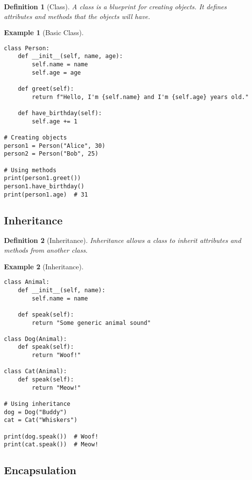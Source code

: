 \documentclass[11pt]{article}
\newtheorem{definition}{Definition}[section]
\newtheorem{example}{Example}[section]
\begin{document}
\begin{definition}[Class]
A class is a blueprint for creating objects. It defines attributes and methods that the objects will have.
\end{definition}

\begin{example}[Basic Class]
\begin{lstlisting}
class Person:
    def __init__(self, name, age):
        self.name = name
        self.age = age
    
    def greet(self):
        return f"Hello, I'm {self.name} and I'm {self.age} years old."
    
    def have_birthday(self):
        self.age += 1

# Creating objects
person1 = Person("Alice", 30)
person2 = Person("Bob", 25)

# Using methods
print(person1.greet())
person1.have_birthday()
print(person1.age)  # 31
\end{lstlisting}
\end{example}

\subsection{Inheritance}

\begin{definition}[Inheritance]
Inheritance allows a class to inherit attributes and methods from another class.
\end{definition}

\begin{example}[Inheritance]
\begin{lstlisting}
class Animal:
    def __init__(self, name):
        self.name = name
    
    def speak(self):
        return "Some generic animal sound"

class Dog(Animal):
    def speak(self):
        return "Woof!"

class Cat(Animal):
    def speak(self):
        return "Meow!"

# Using inheritance
dog = Dog("Buddy")
cat = Cat("Whiskers")

print(dog.speak())  # Woof!
print(cat.speak())  # Meow!
\end{lstlisting}
\end{example}

\subsection{Encapsulation}
\end{document}
